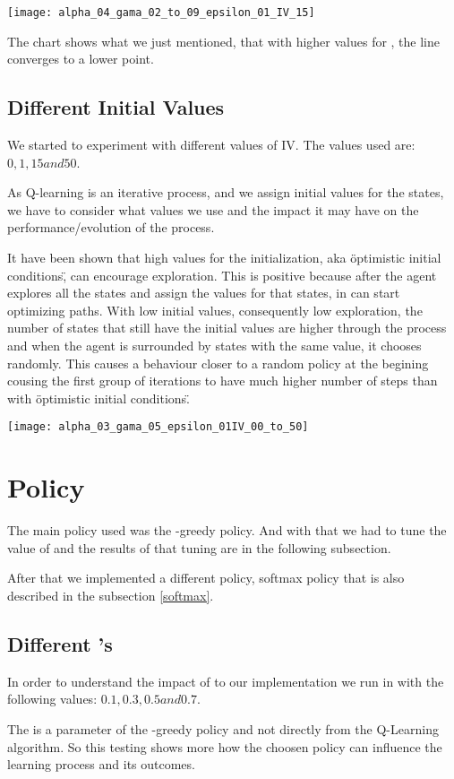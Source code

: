 \documentclass{article}
\begin{document}
\texttt{[image: alpha\_04\_gama\_02\_to\_09\_epsilon\_01\_IV\_15]}

The chart shows what we just mentioned, that with higher values for \gamma, the
line converges to a lower point.

\subsection{Different Initial Values}
We started to experiment with different values of IV. The values used are:
$0, 1, 15 and 50$. 

As Q-learning is an iterative process, and we assign initial values for the
states, we have to consider what values we use and the impact it may have on the
performance/evolution of the process.

It have been shown that high values for the initialization, aka \"optimistic
initial conditions\", can encourage exploration. This is positive because after
the agent explores all the states and assign the values for that states, in can
start optimizing paths.
With low initial values, consequently low exploration, the number of states that
still have the initial values are higher through the process and when the agent
is surrounded by states with the same value, it chooses randomly. This causes a
behaviour closer to a random policy at the begining cousing the first group of
iterations to have much higher number of steps than with \"optimistic
initial conditions\".

\texttt{[image: alpha\_03\_gama\_05\_epsilon\_01IV\_00\_to\_50]}

\section{Policy}
The main policy used was the \epsilon-greedy policy. And with that we had to
tune the value of \epsilon and the results of that tuning are in the following
subsection.

After that we implemented a different policy, softmax policy that is also
described in the subsection \ref{softmax}.

\subsection{Different \epsilon's}
In order to understand the impact of \epsilon to our implementation we run
in with the following values:
$0.1, 0.3, 0.5 and 0.7$.

The \epislon is a parameter of the \epsilon-greedy policy and not directly from
the Q-Learning algorithm. So this testing shows more how the choosen policy can
influence the learning process and its outcomes. 
\end{document}

